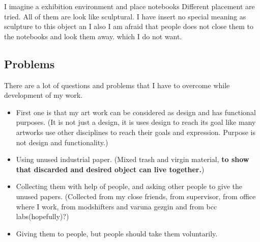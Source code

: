 
I imagine a exhibition environment and place notebooks  Different placement are tried. All of them are look like sculptural. I have insert no special meaning as sculpture to this object an I also I am afraid that people does not close them to the notebooks and look them away. which I do not want. 


\subsection{Problems}
There are a lot of questions and problems that I have to overcome while development of my work. 


\begin{itemize}
\item First one is that my art work can be considered as design and has functional purposes. (It is not just a design, it is uses design to reach its goal like many artworks use other disciplines to reach their goals and expression. Purpose is not design and functionality.)
\item Using unused industrial paper. (Mixed trash and virgin material, \textbf{to show that discarded and desired object can live together.})
\item Collecting them with help of people, and asking other people to give the unused papers. (Collected from my close friends, from supervisor, from office where I work, from modshifters and varuna gezgin and from bcc labs(hopefully)?)
\item Giving them to people, but people should take them voluntarily.
\end{itemize}

